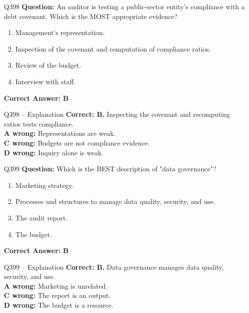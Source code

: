 \documentclass[aspectratio=169,10pt]{beamer}
\begin{document}
	\begin{frame}[t]{Q398}
		\small
		\textbf{Question:} An auditor is testing a public-sector entity's compliance with a debt covenant. Which is the MOST appropriate evidence?
		\begin{enumerate}[label=\Alph*.,itemsep=1pt,topsep=2pt]
			\item Management's representation.
			\item Inspection of the covenant and computation of compliance ratios.
			\item Review of the budget.
			\item Interview with staff.
		\end{enumerate}
		\vspace{4pt}
		\textbf{Correct Answer: B}
	\end{frame}
	
	\begin{frame}[t]{Q398 -- Explanation}
		\small
		\textbf{Correct: B.} Inspecting the covenant and recomputing ratios tests compliance. \\[4pt]
		\textbf{A wrong:} Representations are weak. \\[2pt]
		\textbf{C wrong:} Budgets are not compliance evidence. \\[2pt]
		\textbf{D wrong:} Inquiry alone is weak.
	\end{frame}
	
	\begin{frame}[t]{Q399}
		\small
		\textbf{Question:} Which is the BEST description of "data governance"?
		\begin{enumerate}[label=\Alph*.,itemsep=1pt,topsep=2pt]
			\item Marketing strategy.
			\item Processes and structures to manage data quality, security, and use.
			\item The audit report.
			\item The budget.
		\end{enumerate}
		\vspace{4pt}
		\textbf{Correct Answer: B}
	\end{frame}
	
	\begin{frame}[t]{Q399 -- Explanation}
		\small
		\textbf{Correct: B.} Data governance manages data quality, security, and use. \\[4pt]
		\textbf{A wrong:} Marketing is unrelated. \\[2pt]
		\textbf{C wrong:} The report is an output. \\[2pt]
		\textbf{D wrong:} The budget is a resource.
	\end{frame}
	
\end{document}
